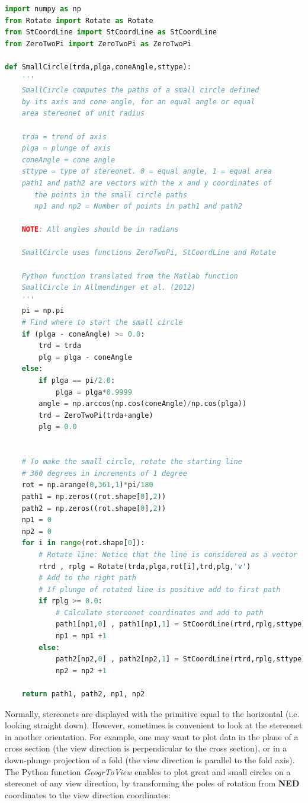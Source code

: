 \documentclass[a4paper , 12pt]{book}
\begin{document}
\begin{lstlisting}[language=Python, frame=single]
import numpy as np
from Rotate import Rotate as Rotate
from StCoordLine import StCoordLine as StCoordLine
from ZeroTwoPi import ZeroTwoPi as ZeroTwoPi

def SmallCircle(trda,plga,coneAngle,sttype):
    '''
	SmallCircle computes the paths of a small circle defined 
	by its axis and cone angle, for an equal angle or equal 
	area stereonet of unit radius
	
	trda = trend of axis
	plga = plunge of axis
	coneAngle = cone angle
	sttype = type of stereonet. 0 = equal angle, 1 = equal area
	path1 and path2 are vectors with the x and y coordinates of 
       the points in the small circle paths
       np1 and np2 = Number of points in path1 and path2
       
    NOTE: All angles should be in radians

	SmallCircle uses functions ZeroTwoPi, StCoordLine and Rotate

	Python function translated from the Matlab function 	
	SmallCircle in Allmendinger et al. (2012)
	'''
    pi = np.pi
	# Find where to start the small circle
    if (plga - coneAngle) >= 0.0:
        trd = trda
        plg = plga - coneAngle
    else:
        if plga == pi/2.0:
            plga = plga*0.9999
        angle = np.arccos(np.cos(coneAngle)/np.cos(plga))
        trd = ZeroTwoPi(trda+angle)
        plg = 0.0
    
    
	# To make the small circle, rotate the starting line 
	# 360 degrees in increments of 1 degree
    rot = np.arange(0,361,1)*pi/180
    path1 = np.zeros((rot.shape[0],2))
    path2 = np.zeros((rot.shape[0],2))
    np1 = 0
    np2 = 0
    for i in range(rot.shape[0]):
        # Rotate line: Notice that the line is considered as a vector
        rtrd , rplg = Rotate(trda,plga,rot[i],trd,plg,'v')
        # Add to the right path
        # If plunge of rotated line is positive add to first path
        if rplg >= 0.0:
            # Calculate stereonet coordinates and add to path
            path1[np1,0] , path1[np1,1] = StCoordLine(rtrd,rplg,sttype)
            np1 = np1 +1
        else:
            path2[np2,0] , path2[np2,1] = StCoordLine(rtrd,rplg,sttype)
            np2 = np2 +1
    
    return path1, path2, np1, np2
\end{lstlisting}

Normally, stereonets are displayed with the primitive equal to the horizontal (i.e. looking straight down). However, sometimes is convenient to look at the stereonet in another orientation. For example, one may want to plot data in the plane of a cross section (the view direction is perpendicular to the cross section), or in a down-plunge projection of a fold (the view direction is parallel to the fold axis). The Python function \textit{GeogrToView} enables to plot great and small circles on a stereonet of any view direction, by transforming the poles of rotation from \textbf{NED} coordinates to the view direction coordinates:
\end{document}
